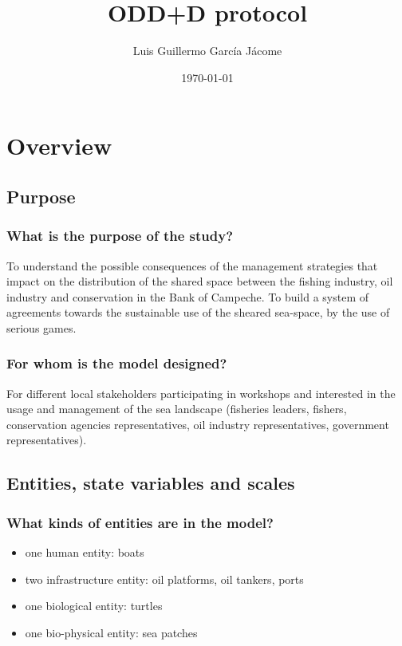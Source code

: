 \documentclass[11pt]{article}
\author{Luis Guillermo García Jácome}
\date{\today}
\title{ODD+D protocol}
\begin{document}
\maketitle
\tableofcontents


\section{Overview}
\label{sec:orga0e63cd}
\subsection{Purpose}
\label{sec:orgafebede}
\subsubsection{What is the purpose of the study?}
\label{sec:orgd22783f}
To understand the possible consequences of the management strategies that impact on the distribution of the shared space between the fishing industry, oil industry and conservation in the Bank of Campeche. To build  a system of agreements towards the sustainable use of the sheared sea-space, by the use of serious games.
\subsubsection{For whom is the model designed?}
\label{sec:org279b7c9}
For different local stakeholders participating in workshops and interested in the usage and management of the sea landscape (fisheries leaders, fishers, conservation agencies representatives, oil industry representatives, government representatives).
\subsection{Entities, state variables and scales}
\label{sec:orga67d89f}
\subsubsection{What kinds of entities are in the model?}
\label{sec:org2cc4e60}
\begin{itemize}
\item one human entity: boats
\item two infrastructure entity: oil platforms, oil tankers, ports
\item one biological entity: turtles
\item one bio-physical entity: sea patches
\end{itemize}
\end{document}
